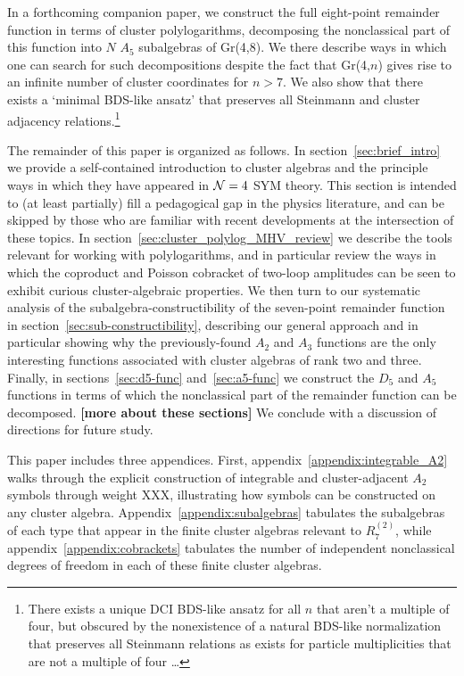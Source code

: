 \documentclass[11pt]{article}
\def\draftnote#1{{\bf [#1]}}
\begin{document}
In a forthcoming companion paper, we construct the full eight-point remainder function in terms of cluster polylogarithms, decomposing the nonclassical part of this function into $N$ $A_5$ subalgebras of Gr(4,8). We there describe ways in which one can search for such decompositions despite the fact that Gr(4,$n$) gives rise to an infinite number of cluster coordinates for $n>7$. We also show that there exists a `minimal BDS-like ansatz' that preserves all Steinmann and cluster adjacency relations.\footnote{There exists a unique DCI BDS-like ansatz for all $n$ that aren't a multiple of four, but  obscured by the nonexistence of a natural BDS-like normalization that preserves all Steinmann relations as exists for particle multiplicities that are not a multiple of four \dots}

The remainder of this paper is organized as follows. In section~\ref{sec:brief_intro} we provide a self-contained introduction to cluster algebras and the principle ways in which they have appeared in ${\cal N} =4$ SYM theory. This section is intended to (at least partially) fill a pedagogical gap in the physics literature, and can be skipped by those who are familiar with recent developments at the intersection of these topics. In section~\ref{sec:cluster_polylog_MHV_review} we describe the tools relevant for working with polylogarithms, and in particular review the ways in which the coproduct and Poisson cobracket of two-loop amplitudes can be seen to exhibit curious cluster-algebraic properties. We then turn to our systematic analysis of the subalgebra-constructibility of the seven-point remainder function in section~\ref{sec:sub-constructibility}, describing our general approach and in particular showing why the previously-found $A_2$ and $A_3$ functions are the only interesting functions associated with cluster algebras of rank two and three. Finally, in sections~\ref{sec:d5-func} and~\ref{sec:a5-func} we construct the $D_5$ and $A_5$ functions in terms of which the nonclassical part of the remainder function can be decomposed. \draftnote{more about these sections} We conclude with a discussion of directions for future study.

This paper includes three appendices. First, appendix~\ref{appendix:integrable_A2} walks through the explicit construction of integrable and cluster-adjacent $A_2$ symbols through weight XXX, illustrating how symbols can be constructed on any cluster algebra. Appendix~\ref{appendix:subalgebras} tabulates the subalgebras of each type that appear in the finite cluster algebras relevant to $R_7^{(2)}$, while appendix~\ref{appendix:cobrackets} tabulates the number of independent nonclassical degrees of freedom in each of these finite cluster algebras.
\end{document}
